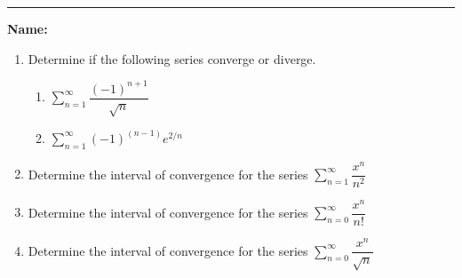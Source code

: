 \documentclass[11pt]{article}
\begin{document}
    \hrule
    \vspace{.5cm}
    \noindent\textbf{Name:} \underline{\qquad\qquad\qquad\qquad\qquad\qquad\qquad\qquad\qquad\qquad\qquad\qquad\qquad}

    \begin{enumerate}
        \item Determine if the following series converge or diverge.
        \begin{enumerate}
            \item $\sum\limits_{n=1}^{\infty}\dfrac{(-1)^{n+1}}{\sqrt{n}}$\vfill
            \item $\sum\limits_{n=1}^{\infty}(-1)^{(n-1)}e^{2/n}$\vfill
        \end{enumerate}
        \newpage
        \item Determine the interval of convergence for the series $\displaystyle\sum_{n=1}^{\infty}\dfrac{x^{n}}{n^{2}}$\vfill
        \item Determine the interval of convergence for the series $\displaystyle\sum_{n=0}^{\infty}\dfrac{x^{n}}{n!}$\vfill
        \item Determine the interval of convergence for the series $\displaystyle\sum_{n=0}^{\infty}\dfrac{x^{n}}{\sqrt{n}}$\vfill
    \end{enumerate}
\end{document}
